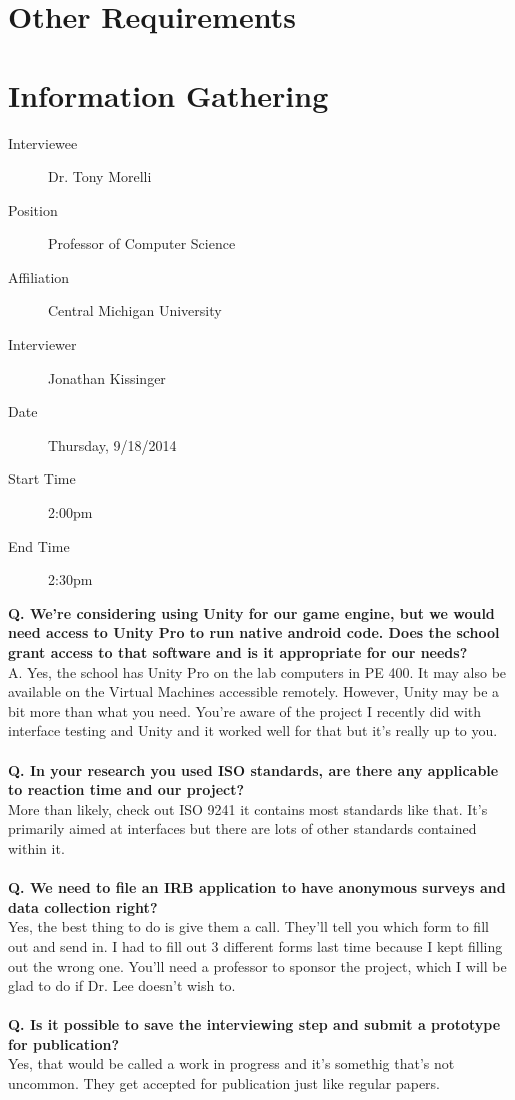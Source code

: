 \documentclass[a4wide]{article}
\begin{document}

\section{Other Requirements}
\newpage
\appendix
\appendixpage

\section{Information Gathering}

\begin{description}
\item[Interviewee] Dr. Tony Morelli
\item[Position] Professor of Computer Science
\item[Affiliation] Central Michigan University
\item[Interviewer] Jonathan Kissinger
\item[Date] Thursday, 9/18/2014
\item[Start Time] 2:00pm
\item[End Time] 2:30pm
\end{description}
\textbf{Q. We’re considering using Unity for our game engine, but we would need
access to Unity Pro to run native android code.  Does the school grant access to
that software and is it appropriate for our needs?}\\
A. Yes, the school has Unity Pro on the lab computers in PE 400.  It may also be
available on the Virtual Machines accessible remotely.  However, Unity may be a
bit more than what you need.  You’re aware of the project I recently did with
interface testing and Unity and it worked well for that but it’s really up to
you.\\\\
\textbf{Q. In your research you used ISO standards, are there any applicable to
reaction time and our project?}\\
More than likely, check out ISO 9241 it contains most standards like that.  It’s
primarily aimed at interfaces but there are lots of other standards contained
within it.\\\\
\textbf{Q. We need to file an IRB application to have anonymous surveys and data
collection right?}\\
Yes, the best thing to do is give them a call.  They’ll tell you which form to
fill out and send in.  I had to fill out 3 different forms last time because I
kept filling out the wrong one.  You’ll need a professor to sponsor the project,
which I will be glad to do if Dr. Lee doesn’t wish to.\\\\
\textbf{Q. Is it possible to save the interviewing step and submit a prototype
for publication?}\\
Yes, that would be called a work in progress and it's somethig that's not
uncommon.  They get accepted for publication just like regular papers.
\end{document}
